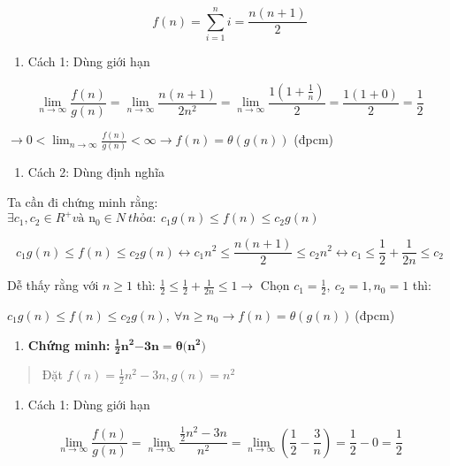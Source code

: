 \documentclass[
]{article}
\begin{document}
\[f(n) = \sum_{i = 1}^{n}{i = \frac{n(n + 1)}{2}}\]

\begin{enumerate}
\item
  Cách 1: Dùng giới hạn
\end{enumerate}

\[\lim_{n \rightarrow \infty}{\frac{f(n)}{g(n)} = \lim_{n \rightarrow \infty}{\frac{n(n + 1)}{2n^{2}} = \lim_{n \rightarrow \infty}{\frac{1(1 + \frac{1}{n})}{2} = \frac{1(1 + 0)}{2}}}} = \frac{1}{2}\]

\(\rightarrow 0 < \lim_{n \rightarrow \infty}\frac{f(n)}{g(n)} < \infty \rightarrow f(n) = \theta(g(n))\)
(đpcm)

\begin{enumerate}
\item
  Cách 2: Dùng định nghĩa
\end{enumerate}

Ta cần đi chứng minh rằng:
\(\exists c_{1},c_{2} \in R^{+}và\text{\ n}_{0} \in N\ thỏa:\ c_{1}g(n) \leq f(n) \leq c_{2}g(n)\)

\[c_{1}g(n) \leq f(n) \leq c_{2}g(n) \leftrightarrow c_{1}n^{2} \leq \frac{n(n + 1)}{2} \leq c_{2}n^{2} \leftrightarrow c_{1} \leq \frac{1}{2} + \frac{1}{2n} \leq c_{2}\]

Dễ thấy rằng với \(n \geq 1\) thì:
\(\frac{1}{2} \leq \frac{1}{2} + \frac{1}{2n} \leq 1 \rightarrow\) Chọn
\(c_{1} = \frac{1}{2},\ c_{2} = 1,n_{0} = 1\) thì:

\(c_{1}g(n) \leq f(n) \leq c_{2}g(n),\ \forall n \geq n_{0} \rightarrow f(n) = \theta(g(n))\ \)(đpcm)

\begin{enumerate}
\item
  \textbf{Chứng minh:}
  \(\frac{\mathbf{1}}{\mathbf{2}}\mathbf{n}^{\mathbf{2}}\mathbf{- 3}\mathbf{n}\mathbf{= \theta(}\mathbf{n}^{\mathbf{2}}\mathbf{)}\)
\end{enumerate}

\begin{quote}
Đặt \(f(n) = \frac{1}{2}n^{2} - 3n,g(n) = n^{2}\)
\end{quote}

\begin{enumerate}
\item
  Cách 1: Dùng giới hạn
\end{enumerate}

\[\lim_{n \rightarrow \infty}{\frac{f(n)}{g(n)} = \lim_{n \rightarrow \infty}\frac{\frac{1}{2}n^{2} - 3n}{n^{2}} = \lim_{n \rightarrow \infty}(\frac{1}{2} - \frac{3}{n}) = \frac{1}{2} - 0 = \frac{1}{2}}\]
\end{document}
